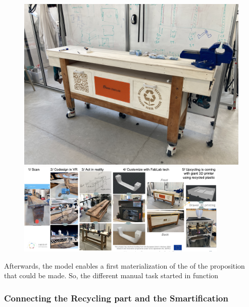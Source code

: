 \documentclass[
  11pt,
]{article}
\begin{document}
\begin{figure}
\begin{minipage}[t]{0.50\linewidth}
{{\includegraphics{figures/demos/workbench/Final.jpeg}

}

}

\end{minipage}%

\caption{\label{fig-demo2}\includegraphics[width=0.9\textwidth,height=\textheight]{figures/demos/workbench/2022-02-24 Processus INEDIT.png}}

\end{figure}

Afterwards, the model enables a first materialization of the of the
proposition that could be made. So, the different manual task started in
function

\hypertarget{connecting-the-recycling-part-and-the-smartification}{%
\subsubsection{Connecting the Recycling part and the
Smartification}\label{connecting-the-recycling-part-and-the-smartification}}
\end{document}
